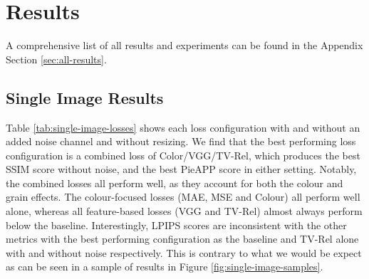 
\section{Results}
\label{sec:results}




A comprehensive list of all results and experiments can be found in the Appendix Section \ref{sec:all-results}.

\subsection{Single Image Results}


Table \ref{tab:single-image-losses} shows each loss configuration with and without an added noise channel and without resizing. We find that the best performing loss configuration is a combined loss of Color/VGG/TV-Rel, which produces the best SSIM score without noise, and the best PieAPP score in either setting. Notably, the combined losses all perform well, as they account for both the colour and grain effects. The colour-focused losses (MAE, MSE and Colour) all perform well alone, whereas all feature-based losses (VGG and TV-Rel) almost always perform below the baseline. Interestingly, LPIPS scores are inconsistent with the other metrics with the best performing configuration as the baseline and TV-Rel alone with and without noise respectively. This is contrary to what we would be expect as can be seen in a sample of results in Figure \ref{fig:single-image-samples}.

